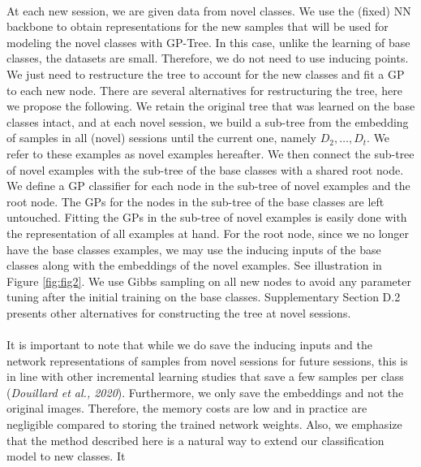 \documentclass[preprint,11pt]{elsarticle}
\begin{document}
        \\
        At each new session, we are given data from novel classes.
        We use the (fixed) NN backbone to obtain representations
        for the new samples that will be used for modeling the novel
        classes with GP-Tree. In this case, unlike the learning of
        base classes, the datasets are small. Therefore, we do not need to use inducing points. We just need to restructure the
        tree to account for the new classes and fit a GP to each new
        node. There are several alternatives for restructuring the
        tree, here we propose the following. We retain the original
        tree that was learned on the base classes intact, and at each
        novel session, we build a sub-tree from the embedding of
        samples in all (novel) sessions until the current one, namely
        $D_2, \ldots,D_t$. We refer to these examples as novel examples
        hereafter. We then connect the sub-tree of novel examples
        with the sub-tree of the base classes with a shared root node.
        We define a GP classifier for each node in the sub-tree of
        novel examples and the root node. The GPs for the nodes in
        the sub-tree of the base classes are left untouched. Fitting
        the GPs in the sub-tree of novel examples is easily done
        with the representation of all examples at hand. For the root
        node, since we no longer have the base classes examples,
        we may use the inducing inputs of the base classes along
        with the embeddings of the novel examples. See illustration
        in Figure \ref{fig:fig2}. We use Gibbs sampling on all new nodes to
        avoid any parameter tuning after the initial training on the
        base classes. Supplementary Section D.2 presents other
        alternatives for constructing the tree at novel sessions.
        \\
        \\
        It is important to note that while we do save the inducing
        inputs and the network representations of samples from
        novel sessions for future sessions, this is in line with other
        incremental learning studies that save a few samples per
        class (\textit{Douillard et al., 2020}\cite{douillard2020podnet}). Furthermore, we only save
        the embeddings and not the original images. Therefore,
        the memory costs are low and in practice are negligible
        compared to storing the trained network weights. Also,
        we emphasize that the method described here is a natural
        way to extend our classification model to new classes. It
\end{document}
